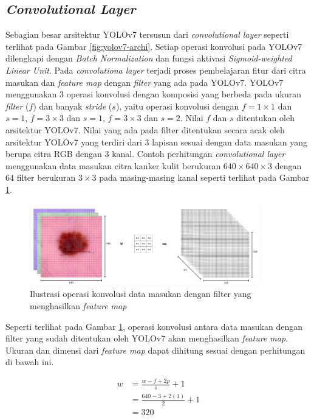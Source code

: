     \subsection{\textit{Convolutional Layer}}
    Sebagian besar arsitektur YOLOv7 tersusun dari \textit{convolutional layer} seperti terlihat pada Gambar \ref{fig:yolov7-archi}. Setiap operasi konvolusi pada YOLOv7 dilengkapi dengan \textit{Batch Normalization} dan fungsi aktivasi \textit{Sigmoid-weighted Linear Unit}. Pada \textit{convolutiona layer} terjadi proses pembelajaran fitur dari citra masukan dan \textit{feature map} dengan \textit{filter} yang ada pada YOLOv7. YOLOv7 menggunakan 3 operasi konvolusi dengan komposisi yang berbeda pada ukuran \textit{filter} ($f$) dan banyak \textit{stride} ($s$), yaitu operasi konvolusi dengan $f=1\times 1$ dan $s=1$, $f=3\times 3$ dan $s=1$, $f=3\times 3$ dan $s=2$. Nilai $f$ dan $s$ ditentukan oleh arsitektur YOLOv7. Nilai yang ada pada filter ditentukan secara acak oleh arsitektur YOLOv7 yang terdiri dari 3 lapisan sesuai dengan data masukan yang berupa citra RGB dengan 3 kanal. Contoh perhitungan \textit{convolutional layer} menggunakan data masukan citra kanker kulit berukuran $640\times 640\times 3$ dengan 64 filter berukuran $3\times 3$ pada masing-masing kanal seperti terlihat pada Gambar \ref{fig:d-convol}.

    \begin{figure}[H]
        \centering
            \includegraphics[width=10cm]{img/bab4/convolution.png}
        \caption{Ilustrasi operasi konvolusi data masukan dengan filter yang menghasilkan \textit{feature map}}
        \label{fig:d-convol}
    \end{figure}

    Seperti terlihat pada Gambar \ref{fig:d-convol}, operasi konvolusi antara data masukan dengan filter yang sudah ditentukan oleh YOLOv7 akan menghasilkan \textit{feature map}. Ukuran dan dimensi dari \textit{feature map} dapat dihitung sesuai dengan perhitungan di bawah ini.

    \begin{align*}
        w &= \frac{w - f + 2p}{s} + 1\\
        &= \frac{640 - 3 + 2(1)}{2} + 1\\
        &= 320
    \end{align*}

